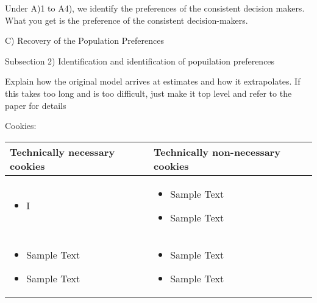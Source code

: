 Under A)1 to A4), we identify the preferences of the consistent decision makers.
What you get is the preference of the consistent decision-makers.

C) Recovery of the Population Preferences

Subsection 2) Identification and identification of popuilation preferences

Explain how the original model arrives at estimates and how it extrapolates. If this takes too long and is too difficult, just make it top level and refer to the paper for details

Cookies: 

\begin{tabular}{p{}|p{}}
    Technically necessary cookies & Technically non-necessary cookies \\
    \hline
    \hline
    \begin{itemize}
      \item I
      \end{itemize}
     &
      \begin{itemize}
      \item Sample Text
      \item Sample Text
    \end{itemize}\\
    \begin{itemize}
      \item Sample Text
      \item Sample Text
      \end{itemize}
      &
      \begin{itemize}
      \item Sample Text
      \item Sample Text
    \end{itemize}

    \end{tabular}